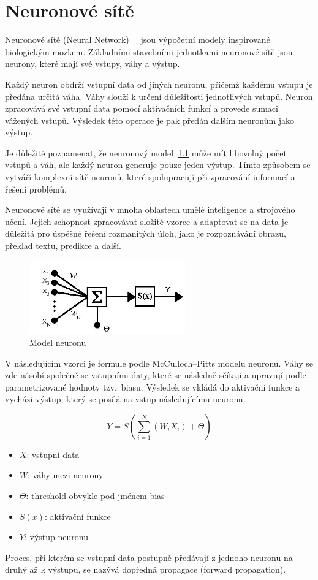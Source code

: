 \chapter{Neuronové sítě}
Neuronové sítě (Neural Network)~\cite{link1}~\cite{link20} jsou výpočetní modely inspirované biologickým mozkem.
Základními stavebními jednotkami neuronové sítě jsou neurony, které mají své vstupy, váhy a výstup.

Každý neuron obdrží vstupní data od jiných neuronů, přičemž každému vstupu je předána určitá váha.
Váhy slouží k určení důležitosti jednotlivých vstupů.
Neuron zpracovává své vstupní data pomocí aktivačních funkcí a provede sumaci vážených vstupů.
Výsledek této operace je pak předán dalším neuronům jako výstup.

Je důležité poznamenat, že neuronový model~\ref{fig:Model neuronu} může mít libovolný počet vstupů a váh, ale každý neuron generuje pouze jeden výstup.
Tímto způsobem se vytváří komplexní sítě neuronů, které spolupracují při zpracování informací a řešení problémů.

Neuronové sítě se využívají v mnoha oblastech umělé inteligence a strojového učení.
Jejich schopnost zpracovávat složité vzorce a adaptovat se na data je důležitá pro úspěšné řešení rozmanitých úloh, jako je rozpoznávání obrazu, překlad textu, predikce a další.

\begin{figure}[H]
	\centering
	\includegraphics[width=0.6\textwidth]{Figures/NeuronModel.jpg}
	\caption{Model neuronu~\cite{link1}}\label{fig:Model neuronu}
\end{figure}

V následujícím vzorci je formule podle McCulloch–Pitts modelu neuronu.
Váhy se zde násobí společně se vstupními daty, které se následně sčítají a upravují podle parametrizované hodnoty tzv.\ biasu.
Výsledek se vkládá do aktivační funkce a vychází výstup, který se posílá na vstup následujícímu neuronu.

\[Y = S(\sum_{i=1}^{N}(W_{i} X_{i}) + \Theta)\]

\begin{itemize}
\item $X$: vstupní data
\item $W$: váhy mezi neurony
\item $\Theta$: threshold obvykle pod jménem bias
\item $S(x)$: aktivační funkce
\item $Y$: výstup neuronu
\end{itemize}
Proces, při kterém se vstupní data postupně předávají z jednoho neuronu na druhý až k výstupu, se nazývá dopředná propagace (forward propagation).

